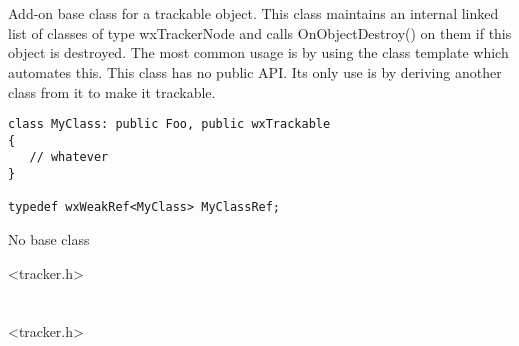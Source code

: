 \section{}\label{wxtrackable}

Add-on base class for a trackable object. This class maintains
an internal linked list of classes of type wxTrackerNode and
calls OnObjectDestroy() on them if this object is destroyed.
The most common usage is by using the 
class template which automates this. This class has no public
API. Its only use is by deriving another class from it to
make it trackable.

\begin{verbatim}
class MyClass: public Foo, public wxTrackable
{
   // whatever
}

typedef wxWeakRef<MyClass> MyClassRef;
\end{verbatim}


No base class


<tracker.h>



\section{}\label{wxtrackable}


<tracker.h>

